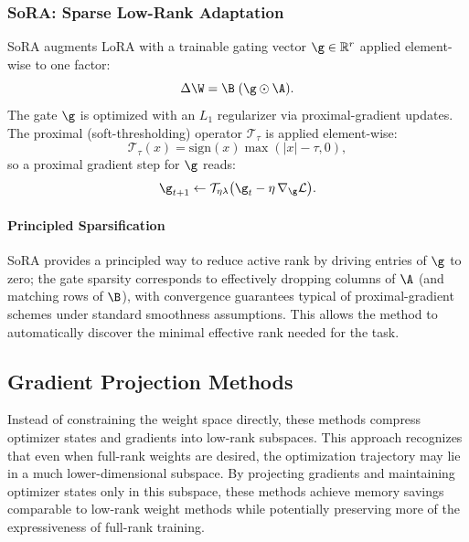 \subsubsection{SoRA: Sparse Low-Rank Adaptation \cite{ding2023sora}}
\label{subsubsec:sora}

SoRA augments LoRA with a trainable gating vector $\g\in\mathbb{R}^{r}$ applied element-wise to one factor:
\begin{equation}
  \Delta\W = \B\;(\g\odot \A).
\end{equation}
The gate $\g$ is optimized with an $L_1$ regularizer via proximal-gradient updates. The proximal (soft-thresholding) operator $\mathcal{T}_{\tau}$ is applied element-wise:
\begin{equation}
  \mathcal{T}_{\tau}(x) = \mathrm{sign}(x)\max(|x|-\tau,0),
\end{equation}
so a proximal gradient step for $\g$ reads:
\begin{equation}
  \g_{t+1} \leftarrow \mathcal{T}_{\eta\lambda}\big(\g_t - \eta\,\nabla_{\g}\mathcal{L}\big).
\end{equation}

\paragraph{Principled Sparsification}
SoRA provides a principled way to reduce active rank by driving entries of $\g$ to zero; the gate sparsity corresponds to effectively dropping columns of $\A$ (and matching rows of $\B$), with convergence guarantees typical of proximal-gradient schemes under standard smoothness assumptions. This allows the method to automatically discover the minimal effective rank needed for the task.

\subsection{Gradient Projection Methods}
\label{subsec:galore}

Instead of constraining the weight space directly, these methods compress optimizer states and gradients into low-rank subspaces. This approach recognizes that even when full-rank weights are desired, the optimization trajectory may lie in a much lower-dimensional subspace. By projecting gradients and maintaining optimizer states only in this subspace, these methods achieve memory savings comparable to low-rank weight methods while potentially preserving more of the expressiveness of full-rank training.

